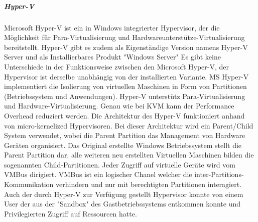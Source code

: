\subparagraph{Hyper-V}
Microsoft Hyper-V ist ein in Windows integrierter Hypervisor, der die Möglichkeit für Para-Virtualisierung und Hardwareunterstütze-Virtualisierung bereitstellt. Hyper-V gibt es zudem als Eigenständige Version namens Hyper-V Server und als Installierbares Produkt "Windows Server" Es gibt keine Unterschiede in der Funktionsweise zwischen den Microsoft Hyper-V, der Hypervisor ist derselbe unabhängig von der installierten Variante. MS Hyper-V implementiert die Isolierung von virtuellen Maschinen in Form von Partitionen (Betriebssystem und Anwendungen). Hyper-V unterstütz Para-Virtualisierung und Hardware-Virtualisierung. Genau wie bei KVM kann der Performance Overhead reduziert werden. Die Architektur des Hyper-V funktioniert anhand von micro-kernelized Hypervisoren. Bei dieser Architektur wird ein Parent/Child System verwendet, wobei die Parent Partition das Management von Hardware Geräten organisiert. Das Original erstellte Windows Betriebssystem stellt die Parent Partition dar, alle weiteren neu erstellten Virtuellen Maschinen bilden die sogenannten Child-Partitionen. Jeder Zugriff auf virtuelle Geräte wird vom VMBus dirigiert. VMBus ist ein logischer Chanel welcher die inter-Partitions-Kommunikation verhindern und nur mit berechtigten Partitionen interagiert. Auch der durch Hyper-V zur Verfügung gestellt Hypervisor konnte von einem User der aus der "Sandbox" des Gastbetriebssystems entkommen konnte und Privilegierten Zugriff auf Ressourcen hatte\cite{Fayyad-Kazan2013BenchmarkingHypervisors}.
